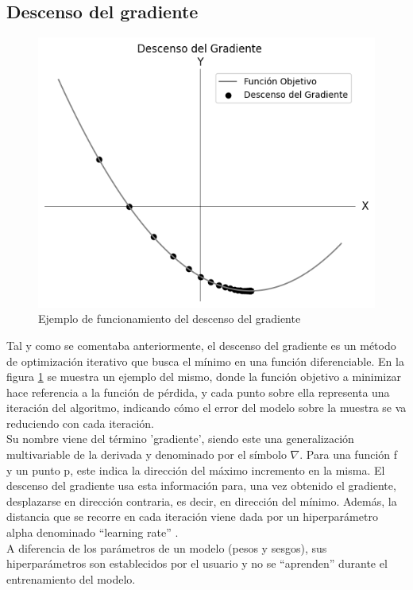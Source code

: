 
\subsection{Descenso del gradiente}

\begin{figure}[H]
	\centering
	\includegraphics[scale=0.4]{imagenes/sgd.jpg}  
	\caption{Ejemplo de funcionamiento del descenso del gradiente}
	\label{fig:SGD}
\end{figure}

Tal y como se comentaba anteriormente, el descenso del gradiente es un método de optimización iterativo que busca el mínimo en una función diferenciable. En la figura \ref{fig:SGD} se muestra un ejemplo del mismo, donde la función objetivo a minimizar hace referencia a la función de pérdida, y cada punto sobre ella representa una iteración del algoritmo, indicando cómo el error del modelo sobre la muestra se va reduciendo con cada iteración. \\
Su nombre viene del término 'gradiente', siendo este una generalización multivariable de la derivada y denominado por el símbolo $\nabla$. Para una función f y un punto p, este indica la dirección del máximo incremento en la misma. El descenso del gradiente usa esta información para, una vez obtenido el gradiente, desplazarse en dirección contraria, es decir, en dirección del mínimo. Además, la distancia que se recorre en cada iteración viene dada por un hiperparámetro alpha denominado ``learning rate'' \cite{SGD_1} \cite{Gradiente} \cite{SGD_2}. \\
A diferencia de los parámetros de un modelo (pesos y sesgos), sus hiperparámetros son establecidos por el usuario y no se ``aprenden'' durante el entrenamiento del modelo.


